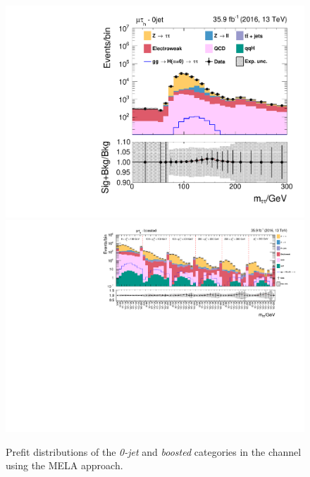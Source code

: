\begin{figure}[h!]
    \centering
        \includegraphics[width=.5\textwidth]{Figures/statana/Postfit_JEC_mela3D/prefit_htt_mt_1_13TeV.pdf}\\
        \includegraphics[width=\textwidth]{Figures/statana/Postfit_JEC_mela3D/prefit_htt_mt_2_13TeV.pdf}
        \caption{Prefit distributions of the \textit{0-jet} and \textit{boosted} categories in the \mutau{} channel using the MELA approach.}
    \end{figure}
